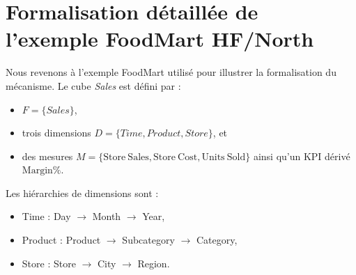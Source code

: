 \section{Formalisation détaillée de l'exemple FoodMart HF/North}
\label{app:foodmart}

Nous revenons à l'exemple FoodMart utilisé pour illustrer la formalisation du mécanisme. Le cube \textit{Sales} est défini par :
\begin{itemize}
  \item $F=\{\textit{Sales}\}$,
  \item trois dimensions $D=\{\textit{Time},\textit{Product},\textit{Store}\}$, et
  \item des mesures $M=\{\mathrm{Store\ Sales},\mathrm{Store\ Cost},\mathrm{Units\ Sold}\}$ ainsi qu'un KPI dérivé $\mathrm{Margin\%}$.
\end{itemize}

Les hiérarchies de dimensions sont :
\begin{itemize}
  \item Time : Day $\rightarrow$ Month $\rightarrow$ Year,
  \item Product : Product $\rightarrow$ Subcategory $\rightarrow$ Category,
  \item Store : Store $\rightarrow$ City $\rightarrow$ Region.
\end{itemize}

